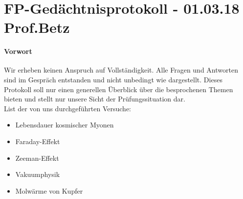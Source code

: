

\section*{FP-Gedächtnisprotokoll - 01.03.18 Prof.Betz} 
\paragraph{Vorwort}
Wir erheben keinen Anspruch auf Vollständigkeit. Alle Fragen und Antworten sind im Gespräch 
entstanden und nicht unbedingt wie dargestellt. Dieses Protokoll soll nur einen generellen Überblick 
über die besprochenen Themen bieten und stellt nur unsere Sicht der Prüfungssituation dar. \\
List der von uns durchgeführten Versuche:

\begin{itemize} 
\item Lebensdauer kosmischer Myonen
\item Faraday-Effekt 
\item Zeeman-Effekt
\item Vakuumphysik
\item Molwärme von Kupfer
 \end{itemize}
